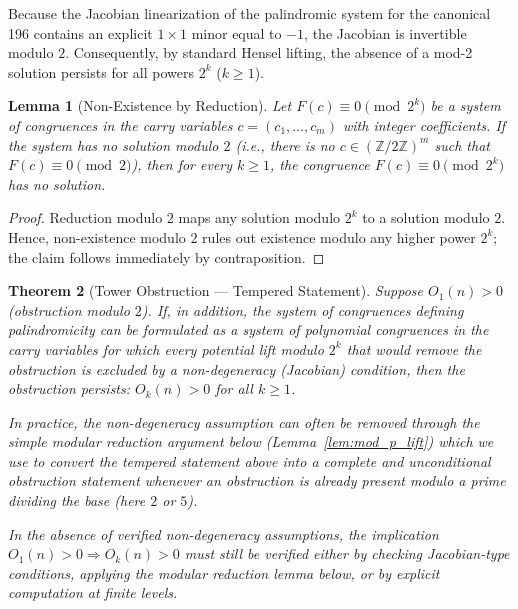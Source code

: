 \documentclass[12pt,a4paper]{article}
\newtheorem{theorem}{Theorem}[section]
\newtheorem{lemma}[theorem]{Lemma}
\begin{document}
Because the Jacobian linearization of the palindromic system for the canonical 196 contains an explicit $1\times 1$ minor equal to $-1$, the Jacobian is invertible modulo $2$. Consequently, by standard Hensel lifting, the absence of a mod-2 solution persists for all powers $2^{k}$ ($k \geq 1$).

\begin{lemma}[Non-Existence by Reduction]
Let $F(c) \equiv 0 \pmod{2^k}$ be a system of congruences in the carry variables $c = (c_1, \dots, c_m)$ with integer coefficients. If the system has no solution modulo $2$ (i.e., there is no $c \in (\mathbb{Z}/2\mathbb{Z})^m$ such that $F(c) \equiv 0 \pmod{2}$), then for every $k \geq 1$, the congruence $F(c) \equiv 0 \pmod{2^k}$ has no solution.
\end{lemma}

\begin{proof}
Reduction modulo $2$ maps any solution modulo $2^k$ to a solution modulo $2$. Hence, non-existence modulo $2$ rules out existence modulo any higher power $2^k$; the claim follows immediately by contraposition.
\end{proof}

\begin{theorem}[Tower Obstruction — Tempered Statement]%
Suppose $O_1(n) > 0$ (obstruction modulo $2$). If, in addition, the system of congruences defining palindromicity can be formulated as a system of polynomial congruences in the carry variables for which every potential lift modulo $2^k$ that would remove the obstruction is excluded by a non-degeneracy (Jacobian) condition, then the obstruction persists: $O_k(n) > 0$ for all $k \geq 1$.

In practice, the non-degeneracy assumption can often be removed through the simple modular reduction argument below (Lemma~\ref{lem:mod_p_lift}) which we use to convert the tempered statement above into a complete and unconditional obstruction statement whenever an obstruction is already present modulo a prime dividing the base (here $2$ or $5$).

In the absence of verified non-degeneracy assumptions, the implication $O_1(n) > 0 \Rightarrow O_k(n) > 0$ must still be verified either by checking Jacobian-type conditions, applying the modular reduction lemma below, or by explicit computation at finite levels.
\end{theorem}
\end{document}
